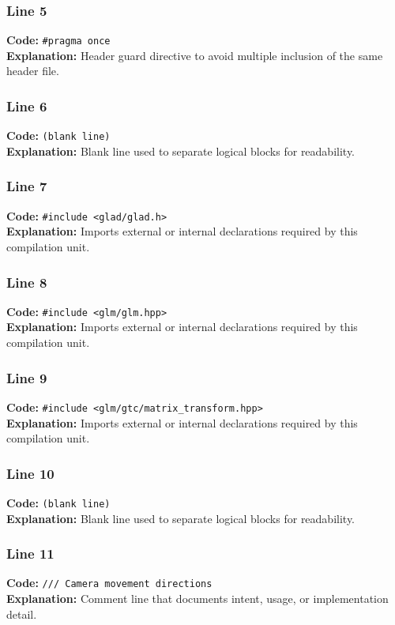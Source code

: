 \documentclass[11pt,a4paper]{article}
\begin{document}
\subsubsection*{Line 5}
\textbf{Code:} \verb|#pragma once|\\
\textbf{Explanation:} Header guard directive to avoid multiple inclusion of the same header file.

\subsubsection*{Line 6}
\textbf{Code:} \texttt{(blank line)}\\
\textbf{Explanation:} Blank line used to separate logical blocks for readability.

\subsubsection*{Line 7}
\textbf{Code:} \verb|#include <glad/glad.h>|\\
\textbf{Explanation:} Imports external or internal declarations required by this compilation unit.

\subsubsection*{Line 8}
\textbf{Code:} \verb|#include <glm/glm.hpp>|\\
\textbf{Explanation:} Imports external or internal declarations required by this compilation unit.

\subsubsection*{Line 9}
\textbf{Code:} \verb|#include <glm/gtc/matrix_transform.hpp>|\\
\textbf{Explanation:} Imports external or internal declarations required by this compilation unit.

\subsubsection*{Line 10}
\textbf{Code:} \texttt{(blank line)}\\
\textbf{Explanation:} Blank line used to separate logical blocks for readability.

\subsubsection*{Line 11}
\textbf{Code:} \verb|/// Camera movement directions|\\
\textbf{Explanation:} Comment line that documents intent, usage, or implementation detail.
\end{document}
